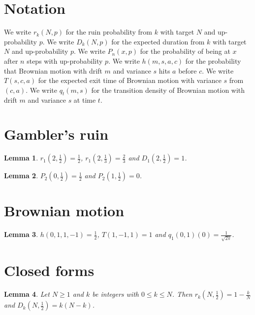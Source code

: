 \documentclass{article}
\newtheorem{lemma}{Lemma}
\begin{document}
\section{Notation}

We write $r_k(N,p)$ for the ruin probability from $k$ with target $N$ and up-probability $p$.
We write $D_k(N,p)$ for the expected duration from $k$ with target $N$ and up-probability $p$.
We write $P_n(x,p)$ for the probability of being at $x$ after $n$ steps with up-probability $p$.
We write $h(m,s,a,c)$ for the probability that Brownian motion with drift $m$ and variance $s$ hits $a$ before $c$.
We write $T(s,c,a)$ for the expected exit time of Brownian motion with variance $s$ from $(c,a)$.
We write $q_t(m,s)$ for the transition density of Brownian motion with drift $m$ and variance $s$ at time $t$.

\section{Gambler's ruin}

\begin{lemma}\label{fair}
$r_1(2,\frac12)=\frac12$, $r_1(2,\frac13)=\frac23$ and $D_1(2,\frac12)=1$.
\end{lemma}

\begin{lemma}\label{walk}
$P_2(0,\frac12)=\frac12$ and $P_2(1,\frac12)=0$.
\end{lemma}

\section{Brownian motion}

\begin{lemma}\label{brownian}
$h(0,1,1,-1)=\frac12$, $T(1,-1,1)=1$ and $q_1(0,1)(0)=\frac{1}{\sqrt{2\pi}}$.
\end{lemma}

\section{Closed forms}

\begin{lemma}\label{closed}
Let $N\ge1$ and $k$ be integers with $0\le k\le N$. Then $r_k(N,\frac12)=1-\frac{k}{N}$ and $D_k(N,\frac12)=k(N-k)$.
\end{lemma}
\end{document}
